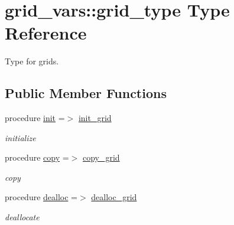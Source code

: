 \hypertarget{structgrid__vars_1_1grid__type}{}\section{grid\+\_\+vars\+:\+:grid\+\_\+type Type Reference}
\label{structgrid__vars_1_1grid__type}


Type for grids.  


\subsection*{Public Member Functions}
\begin{DoxyCompactItemize}
\item 
procedure \hyperlink{structgrid__vars_1_1grid__type_acba4d0b9bc4a2eb7d383bcbb14739aa1}{init} =$>$ \hyperlink{namespacegrid__vars_aa0d888796fd875e9024443e46eeb11f8}{init\+\_\+grid}
\begin{DoxyCompactList}\small\item\em initialize \end{DoxyCompactList}\item 
procedure \hyperlink{structgrid__vars_1_1grid__type_a008d4c568ffcab84ffc306e3ccca64d6}{copy} =$>$ \hyperlink{namespacegrid__vars_a6fa9a9920f1a700d50075bc9c291a247}{copy\+\_\+grid}
\begin{DoxyCompactList}\small\item\em copy \end{DoxyCompactList}\item 
procedure \hyperlink{structgrid__vars_1_1grid__type_aa963e30745f5e69eb796f2da94c35227}{dealloc} =$>$ \hyperlink{namespacegrid__vars_abc8ea59261a1e773754afebdb13276f9}{dealloc\+\_\+grid}
\begin{DoxyCompactList}\small\item\em deallocate \end{DoxyCompactList}\end{DoxyCompactItemize}
